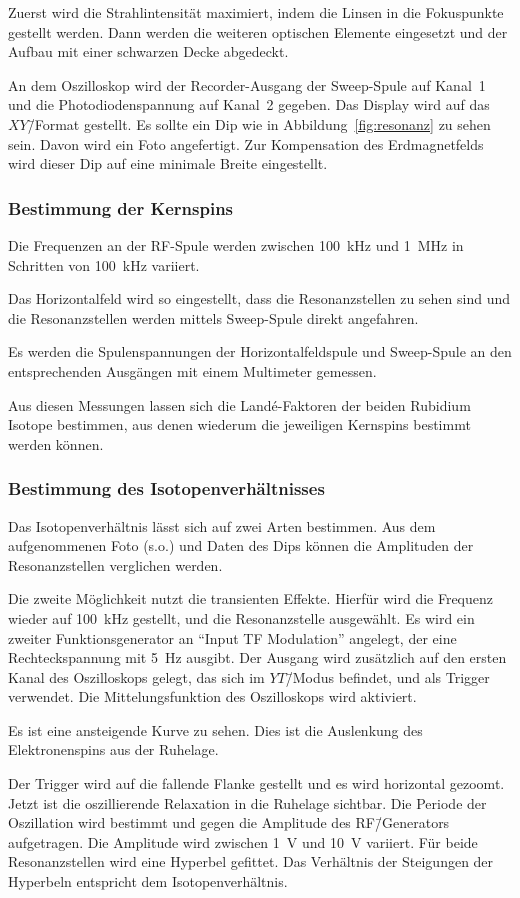 Zuerst wird die Strahlintensität maximiert, indem die Linsen in die Fokuspunkte
gestellt werden.
Dann werden die weiteren optischen Elemente eingesetzt und der Aufbau mit einer
schwarzen Decke abgedeckt.

An dem Oszilloskop wird der Recorder-Ausgang der Sweep-Spule auf Kanal~1 und die
Photodiodenspannung auf Kanal~2 gegeben.
Das Display wird auf das $XY$\=/Format gestellt.
Es sollte ein Dip wie in Abbildung~\ref{fig:resonanz} zu sehen sein.
Davon wird ein Foto angefertigt.
Zur Kompensation des Erdmagnetfelds wird dieser Dip auf eine minimale Breite
eingestellt.


\subsubsection{Bestimmung der Kernspins}%
\label{sub:bestimmung_der_kernspins}

Die Frequenzen an der RF-Spule werden zwischen \SI{100}{\kilo\hertz} und
\SI{1}{\mega\hertz} in Schritten von \SI{100}{\kilo\hertz} variiert.

Das Horizontalfeld wird so eingestellt, dass die Resonanzstellen zu sehen sind
und
die Resonanzstellen werden mittels Sweep-Spule direkt angefahren.

Es werden die Spulenspannungen der Horizontalfeldspule und Sweep-Spule
an den entsprechenden Ausgängen mit einem Multimeter gemessen.

Aus diesen Messungen lassen sich die Land\'e-Faktoren der beiden Rubidium
Isotope bestimmen, aus denen wiederum die jeweiligen Kernspins bestimmt werden
können.

\subsubsection{Bestimmung des Isotopenverhältnisses}%
\label{sub:bestimmung_des_isotopenverhaltnisses}

Das Isotopenverhältnis lässt sich auf zwei Arten bestimmen.
Aus dem aufgenommenen Foto (s.o.) und Daten des Dips können die
Amplituden der Resonanzstellen verglichen werden.

Die zweite Möglichkeit nutzt die transienten Effekte.
Hierfür wird die Frequenz wieder auf \SI{100}{\kilo\hertz} gestellt,
und die Resonanzstelle ausgewählt.
Es wird ein zweiter Funktionsgenerator an \enquote{Input TF Modulation}
angelegt, der eine Rechteckspannung mit \SI{5}{\hertz} ausgibt.
Der Ausgang wird zusätzlich auf den ersten Kanal des Oszilloskops gelegt, das
sich im $YT$\=/Modus befindet, und als Trigger verwendet.
Die Mittelungsfunktion des Oszilloskops wird aktiviert.

Es ist eine ansteigende Kurve zu sehen.
Dies ist die Auslenkung des Elektronenspins aus der Ruhelage.

Der Trigger wird auf die fallende Flanke gestellt und es wird horizontal
gezoomt.
Jetzt ist die oszillierende Relaxation in die Ruhelage sichtbar.
Die Periode der Oszillation wird bestimmt und gegen die Amplitude des
RF\=/Generators aufgetragen.
Die Amplitude wird zwischen \SI{1}{\volt} und \SI{10}{\volt} variiert.
Für beide Resonanzstellen wird eine Hyperbel gefittet.
Das Verhältnis der Steigungen der Hyperbeln entspricht dem Isotopenverhältnis.
